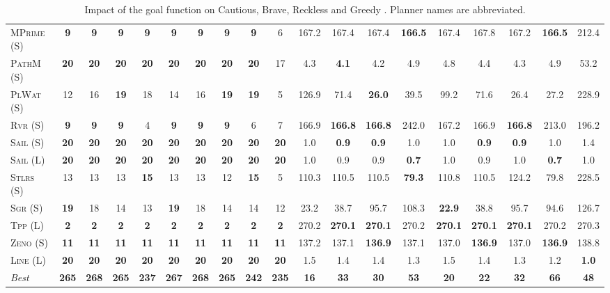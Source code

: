 \documentclass[11pt,landscape]{article}
\begin{document}
\begin{table}[tb]
{\begin{tabular}{|l||ccccccccc||ccccccccc||}
\textsc{MPrime} (S)&\textbf{9}&\textbf{9}&\textbf{9}&\textbf{9}&\textbf{9}&\textbf{9}&\textbf{9}&\textbf{9}&6&167.2&167.4&167.4&\textbf{166.5}&167.4&167.8&167.2&\textbf{166.5}&212.4\\
\textsc{PathM} (S)&\textbf{20}&\textbf{20}&\textbf{20}&\textbf{20}&\textbf{20}&\textbf{20}&\textbf{20}&\textbf{20}&17&4.3&\textbf{4.1}&4.2&4.9&4.8&4.4&4.3&4.9&53.2\\
\textsc{PlWat} (S)&12&16&\textbf{19}&18&14&16&\textbf{19}&\textbf{19}&5&126.9&71.4&\textbf{26.0}&39.5&99.2&71.6&26.4&27.2&228.9\\
\textsc{Rvr} (S)&\textbf{9}&\textbf{9}&\textbf{9}&4&\textbf{9}&\textbf{9}&\textbf{9}&6&7&166.9&\textbf{166.8}&\textbf{166.8}&242.0&167.2&166.9&\textbf{166.8}&213.0&196.2\\
\textsc{Sail} (S)&\textbf{20}&\textbf{20}&\textbf{20}&\textbf{20}&\textbf{20}&\textbf{20}&\textbf{20}&\textbf{20}&\textbf{20}&1.0&\textbf{0.9}&\textbf{0.9}&1.0&1.0&\textbf{0.9}&\textbf{0.9}&1.0&1.4\\
\textsc{Sail} (L)&\textbf{20}&\textbf{20}&\textbf{20}&\textbf{20}&\textbf{20}&\textbf{20}&\textbf{20}&\textbf{20}&\textbf{20}&1.0&0.9&0.9&\textbf{0.7}&1.0&0.9&1.0&\textbf{0.7}&1.0\\
\textsc{Stlrs} (S)&13&13&13&\textbf{15}&13&13&12&\textbf{15}&5&110.3&110.5&110.5&\textbf{79.3}&110.8&110.5&124.2&79.8&228.5\\
\textsc{Sgr} (S)&\textbf{19}&18&14&13&\textbf{19}&18&14&14&12&23.2&38.7&95.7&108.3&\textbf{22.9}&38.8&95.7&94.6&126.7\\
\textsc{Tpp} (L)&\textbf{2}&\textbf{2}&\textbf{2}&\textbf{2}&\textbf{2}&\textbf{2}&\textbf{2}&\textbf{2}&\textbf{2}&270.2&\textbf{270.1}&\textbf{270.1}&270.2&\textbf{270.1}&\textbf{270.1}&\textbf{270.1}&270.2&270.3\\
\textsc{Zeno} (S)&\textbf{11}&\textbf{11}&\textbf{11}&\textbf{11}&\textbf{11}&\textbf{11}&\textbf{11}&\textbf{11}&\textbf{11}&137.2&137.1&\textbf{136.9}&137.1&137.0&\textbf{136.9}&137.0&\textbf{136.9}&138.8\\
\textsc{Line} (L)&\textbf{20}&\textbf{20}&\textbf{20}&\textbf{20}&\textbf{20}&\textbf{20}&\textbf{20}&\textbf{20}&\textbf{20}&1.5&1.4&1.4&1.3&1.5&1.4&1.3&1.2&\textbf{1.0}
\\\hline
\textit{Best}&\textbf{265}&\textbf{268}&\textbf{265}&\textbf{237}&\textbf{267}&\textbf{268}&\textbf{265}&\textbf{242}&\textbf{235}&\textbf{16}&\textbf{33}&\textbf{30}&\textbf{53}&\textbf{20}&\textbf{22}&\textbf{32}&\textbf{66}&\textbf{48}\\\hline

        \end{tabular}}
        \caption{Impact of the goal function on Cautious, Brave, Reckless and Greedy \pattyd. Planner names are abbreviated.}
        \label{tab:abl-gf}
        \end{table}
        
\end{document}
